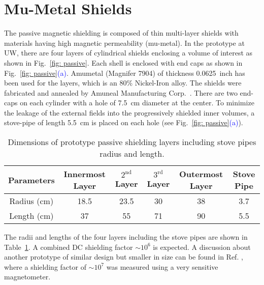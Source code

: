 \section{Mu-Metal Shields}\label{sec:shield}
The passive magnetic shielding is composed of thin multi-layer shields with materials having high magnetic permeability (mu-metal). 
In the prototype at UW, there are four layers of cylindrical shields enclosing a volume of interest as shown in Fig.~\ref{fig: passive}. Each shell is enclosed  with end caps as shown in Fig.~\ref{fig: passive}\textcolor{blue}{(a)}. Amumetal (Magnifer 7904) of thickness 0.0625~inch has been used for the layers,  which is an 80\% Nickel-Iron alloy. The shields were fabricated and annealed by Amuneal Manufacturing Corp.~\cite{mu-metal}.  There are two end-caps on each cylinder with a hole of 7.5~cm diameter at the center. To minimize the leakage of the external fields into the progressively shielded inner volumes, a stove-pipe of length 5.5~cm is placed on each hole (see Fig.~\ref{fig: passive}\textcolor{blue}{(a)}).

\begin{table} [!htb]
    \centering
    \begin{tabular} { |c|c|c|c|c|c|} 
        \hline
        Parameters & Innermost Layer & $\mathrm{2^{nd}}$ Layer & $\mathrm{3^{rd}}$ Layer & Outermost Layer & Stove Pipe\\
        \hline\hline
        Radius (cm) & 18.5 & 23.5 & 30 & 38 & 3.7 \\ 
        \hline
        Length (cm) & 37 & 55 & 71 & 90 & 5.5 \\ 
         \hline
    \end{tabular}
    \caption[Dimensions of prototype passive shielding layers]{Dimensions of prototype passive shielding layers including stove pipes radius and length.}\label{table:mu-metal}
\end{table}

The radii and lengths of the four layers including the stove pipes are shown in Table~\ref{table:mu-metal}. A combined DC shielding factor $\sim\mathrm{10^6}$ is expected. A discussion about another prototype of similar design but smaller in size can be found in Ref. \cite{baby_shield}, where a shielding factor of $\sim\mathrm{10^7}$ was measured using a very sensitive magnetometer.



